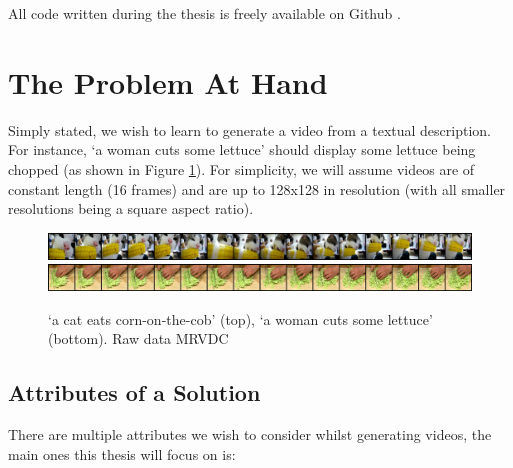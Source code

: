 \documentclass{report}
\theoremstyle{plain}
\theoremstyle{definition}
\theoremstyle{remark}
\numberwithin{equation}{section}
\numberwithin{figure}{section}
\newcommand{\<}{\langle}
\renewcommand{\>}{\rangle}
\begin{document}
All code written during the thesis is freely available on Github \cite{martin_miguelmartin75/txt2vid_nodate}.

\section{The Problem At Hand}

Simply stated, we wish to learn to generate a video from a textual description. For instance, `a woman cuts some lettuce' should display some lettuce being chopped (as shown in Figure \ref{fig:example}). For simplicity, we will assume videos are of constant length (16 frames) and are up to 128x128 in resolution (with all smaller resolutions being a square aspect ratio).

\begin{figure}[H] \label{fig:example}
    \centering
    \caption{`a cat eats corn-on-the-cob' (top), `a woman cuts some lettuce' (bottom). Raw data MRVDC \cite{noauthor_microsoft_nodate}}
    \includegraphics[width=0.8\linewidth]{images/cat_real.png}\\
    \includegraphics[width=0.8\linewidth]{images/real_131.png}\\
\end{figure}

\subsection{Attributes of a Solution}

There are multiple attributes we wish to consider whilst generating videos, the main ones this thesis will focus on is: 
\end{document}
